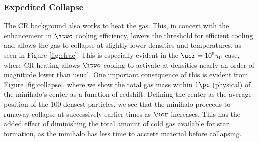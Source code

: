 \subsubsection{Expedited Collapse}
The CR background also works to heat the gas.  This, in concert with the enhancement in $\htwo$ cooling efficiency, lowers the threshold for efficient cooling and allows the gas to collapse at slightly lower densities and temperatures, as seen in Figure \ref{fig:efrac}.  This is especially evident in the $\ucr = 10^5 u_0$ case, where CR heating allows $\htwo$ cooling to activate at densities nearly an order of magnitude lower than usual.  One important consequence of this is evident from Figure \ref{fig:collapse}, where we show the total gas mass within $1\pc$ (physical) of the minihalo's center as a function of redshift.  Defining the center as the average position of the 100 densest particles, we see that the minihalo proceeds to runaway collapse at successively earlier times as $\ucr$ increases.  This has the added effect of diminishing the total amount of cold gas available for star formation, as the minihalo has less time to accrete material before collapsing.